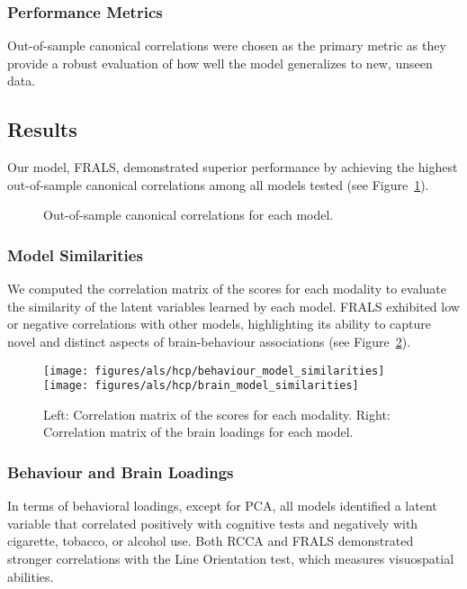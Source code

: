 \subsubsection{Performance Metrics}
Out-of-sample canonical correlations were chosen as the primary metric as they provide a robust evaluation of how well the model generalizes to new, unseen data.

\subsection{Results}
Our model, FRALS, demonstrated superior performance by achieving the highest out-of-sample canonical correlations among all models tested (see Figure~\ref{fig:performance}).

\begin{figure}[h]
\centering

\caption{Out-of-sample canonical correlations for each model.}
\label{fig:performance}
\end{figure}

\subsubsection{Model Similarities}
We computed the correlation matrix of the scores for each modality to evaluate the similarity of the latent variables learned by each model.
FRALS exhibited low or negative correlations with other models, highlighting its ability to capture novel and distinct aspects of brain-behaviour associations (see Figure~\ref{fig:similarities}).

\begin{figure}[h]
\centering
\texttt{[image: figures/als/hcp/behaviour\_model\_similarities]}
\texttt{[image: figures/als/hcp/brain\_model\_similarities]}
\caption{Left: Correlation matrix of the scores for each modality. Right: Correlation matrix of the brain loadings for each model.}
\label{fig:similarities}
\end{figure}

\subsubsection{Behaviour and Brain Loadings}
In terms of behavioral loadings, except for PCA, all models identified a latent variable that correlated positively with cognitive tests and negatively with cigarette, tobacco, or alcohol use.
Both RCCA and FRALS demonstrated stronger correlations with the Line Orientation test, which measures visuospatial abilities.

